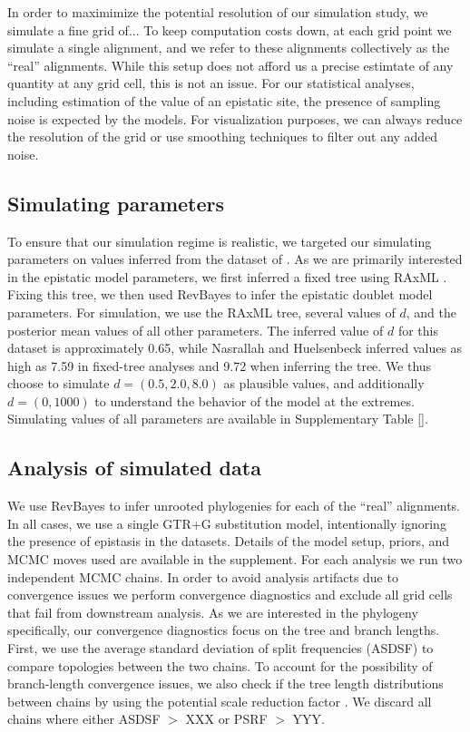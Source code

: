 \documentclass[11pt]{article}
\newcommand{\amcomment}[1]{{\color{blue}{(\textbf{AM's comment:} #1)}}}
\begin{document}
In order to maximimize the potential resolution of our simulation study, we simulate a fine grid of... \amcomment{what is our current grid size? I've lost track}
To keep computation costs down, at each grid point we simulate a single alignment, and we refer to these alignments collectively as the ``real'' alignments.
While this setup does not afford us a precise estimtate of any quantity at any grid cell, this is not an issue.
For our statistical analyses, including estimation of the value of an epistatic site, the presence of sampling noise is expected by the models.
For visualization purposes, we can always reduce the resolution of the grid or use smoothing techniques to filter out any added noise.

\subsection*{Simulating parameters\label{sec:tunicates}}
To ensure that our simulation regime is realistic, we targeted our simulating parameters on values inferred from the dataset of \cite{}.
As we are primarily interested in the epistatic model parameters, we first inferred a fixed tree using RAxML \citep{stamatakis2014raxml}.
Fixing this tree, we then used RevBayes to infer the epistatic doublet model parameters.
For simulation, we use the RAxML tree, several values of $d$, and the posterior mean values of all other parameters.
The inferred value of $d$ for this dataset is approximately 0.65, while Nasrallah and Huelsenbeck inferred values as high as 7.59 in fixed-tree analyses and 9.72 when inferring the tree.
We thus choose to simulate $d = (0.5,2.0,8.0)$ as plausible values, and additionally $d=(0,1000)$ to understand the behavior of the model at the extremes.
Simulating values of all parameters are available in Supplementary Table \ref{}.

\subsection*{Analysis of simulated data\label{sec:mcmc}}
We use RevBayes \citep{hohna2016revbayes} to infer unrooted phylogenies for each of the ``real'' alignments.
In all cases, we use a single GTR+G substitution model, intentionally ignoring the presence of epistasis in the datasets.
Details of the model setup, priors, and MCMC moves used are available in the supplement.
For each analysis we run two independent MCMC chains.
In order to avoid analysis artifacts due to convergence issues we perform convergence diagnostics and exclude all grid cells that fail from downstream analysis.
As we are interested in the phylogeny specifically, our convergence diagnostics focus on the tree and branch lengths.
First, we use the average standard deviation of split frequencies (ASDSF) to compare topologies between the two chains.
To account for the possibility of branch-length convergence issues, we also check if the tree length distributions between chains by using the potential scale reduction factor \citep[PSRF,\ ][]{brooks1998general}.
We discard all chains where either ASDSF $>$ XXX or PSRF $>$ YYY.
\end{document}
